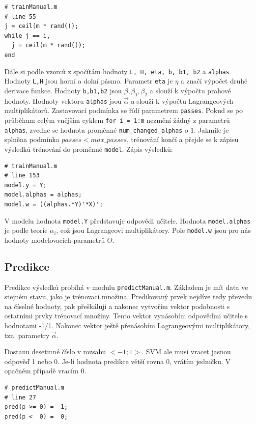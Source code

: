 \documentclass[a4]{article}
\begin{document}
\begin{lstlisting}
# trainManual.m
# line 55
j = ceil(m * rand());
while j == i,
  j = ceil(m * rand());
end
\end{lstlisting}

\noindent Dále si podle vzorců z \cite{smo_platt_original} spočítám hodnoty \texttt{L, H, eta, b, b1, b2} a \texttt{alphas}. Hodnoty \texttt{L,H} jsou horní a dolní pásmo. Parametr \texttt{eta} je $\eta$ a značí výpočet druhé derivace funkce. Hodnoty \texttt{b,b1,b2} jsou $\beta, \beta_1, \beta_2$ a slouží k výpočtu prahové hodnoty. Hodnoty vektoru \texttt{alphas} jsou $\vec{\alpha}$ a slouží k výpočtu Lagrangeových multiplikátorů. Zastavovací podmínka se řídí parametrem \texttt{passes}. Pokud se po průběhum celým vnějším cyklem \texttt{for i = 1:m} nezmění žádný z parametrů \texttt{alphas}, zvedne se hodnota proměnné \texttt{num\_changed\_alphas} o 1. Jakmile je splněna podmínka $passes < max\_passes$, trénování končí a přejde se k zápisu výsledků trénování do proměnné \texttt{model}. Zápis výsledků:

\begin{lstlisting}
# trainManual.m
# line 153
model.y = Y;
model.alphas = alphas;
model.w = ((alphas.*Y)'*X)';
\end{lstlisting}

\noindent V modelu hodnota \texttt{model.Y} představuje odpovědi učitele. Hodnota \texttt{model.alphas} je podle teorie $\alpha_i$, což jsou Lagrangeovi multiplikátory. Pole \texttt{model.w} jsou pro nás hodnoty modelovacích parametrů $\Theta$.

\subsection{Predikce}
Predikce výsledků probíhá v modulu \texttt{predictManual.m}. Základem je mít data ve stejném stavu, jako je trénovací množina. Predikovaný prvek nejdíve tedy převedu na číselné hodnoty, pak přeškáluji a nakonec vytvořím vektor podobnosti s ostatními prvky trénovací množiny. Tento vektor vynásobím odpověďmi učitele s hodnotami -1/1. Nakonec vektor ještě přenásobím Lagrangeovými multiplikátory, tzn. parametry $\vec{\alpha}$.

\noindent Dostanu desetinné číslo v rozsahu $<-1;1>$. SVM ale musí vracet jasnou odpověď 1 nebo 0. Je-li hodnota predikce větší rovna 0, vrátím jedničku. V opačném případě vracím 0.

\begin{lstlisting}
# predictManual.m
# line 27
pred(p >= 0) =  1;
pred(p <  0) =  0;
\end{lstlisting} 
\end{document}
